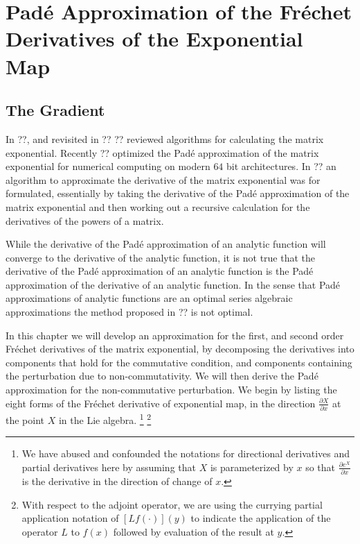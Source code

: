 \chapter{Pad\'{e} Approximation of the Fr\'{e}chet Derivatives of the Exponential Map}
\section{The Gradient}
In ??, and revisited in ?? ?? reviewed algorithms for calculating the matrix 
exponential. Recently ?? optimized the Pad\'{e} approximation of the matrix 
exponential for numerical computing on modern $64$ bit architectures. In ?? an 
algorithm to approximate the derivative of the matrix exponential was for 
formulated, essentially by taking the derivative of the Pad\'{e} approximation 
of the matrix exponential and then working out a recursive calculation for the
derivatives of the powers of a matrix.

While the derivative of the Pad\'{e} approximation of an analytic function will 
converge to the derivative of the analytic function, it is not true that the
derivative of the Pad\'{e} approximation of an analytic function is the Pad\'{e} 
approximation of the derivative of an analytic function. In the sense that 
Pad\'{e} approximations of analytic functions are an optimal series algebraic 
approximations the method proposed in ?? is not optimal.

In this chapter we will develop an approximation for the first, and second order
Fr\'{e}chet derivatives of the matrix exponential, by decomposing the 
derivatives into components that hold for the commutative condition, and 
components containing the perturbation due to non-commutativity. We will then 
derive the Pad\'{e} approximation for the non-commutative perturbation. We begin 
by listing the eight forms of the Fr\'{e}chet derivative of exponential map, in 
the direction $\frac{\partial X}{\partial x}$ at the point $X$ in the Lie 
algebra.
\footnote{We have abused and confounded the notations for directional 
derivatives and partial derivatives here by assuming that $X$ is parameterized 
by $x$ so that $\frac{\partial e^X}{\partial x}$ is the derivative in the
direction of change of $x$.}
\footnote{With respect to the adjoint operator, we are using the currying 
partial application notation of $\left[L f\left(\cdotp\right)\right]\left(y\right)$
to indicate the application of the operator $L$ to $f\left(x\right)$ followed by
evaluation of the result at $y$.}

